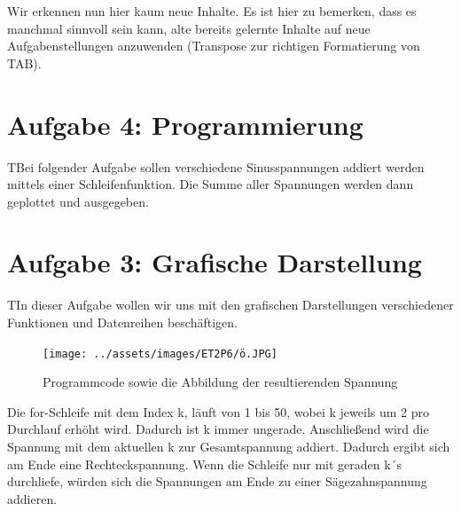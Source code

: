 \documentclass{article}
\begin{document}
Wir erkennen nun hier kaum neue Inhalte. Es ist hier zu bemerken, dass es manchmal sinnvoll sein kann, alte bereits gelernte Inhalte auf neue Aufgabenstellungen anzuwenden (Transpose zur richtigen Formatierung von TAB).
\newpage
\section{Aufgabe 4: Programmierung}
\begin{task}
  TBei folgender Aufgabe sollen verschiedene Sinusspannungen addiert werden mittels einer Schleifenfunktion. Die Summe aller Spannungen werden dann geplottet und ausgegeben.
\end{task}


\section{Aufgabe 3: Grafische Darstellung}

\begin{task}
  TIn dieser Aufgabe wollen wir uns mit den grafischen Darstellungen verschiedener Funktionen und Datenreihen beschäftigen.
\end{task}


\begin{figure}[h]
  \centering
  \texttt{[image: ../assets/images/ET2P6/ö.JPG]}
  \caption{Programmcode sowie die Abbildung der resultierenden Spannung}
\end{figure}

Die for-Schleife mit dem Index k, läuft von 1 bis 50, wobei k jeweils um 2 pro Durchlauf erhöht wird.
Dadurch ist k immer ungerade. Anschließend wird die Spannung mit dem aktuellen k zur Gesamtspannung addiert.
Dadurch ergibt sich am Ende eine Rechteckspannung.
Wenn die Schleife nur mit geraden k´s durchliefe, würden sich die Spannungen am Ende zu einer Sägezahnspannung addieren.
\end{document}
